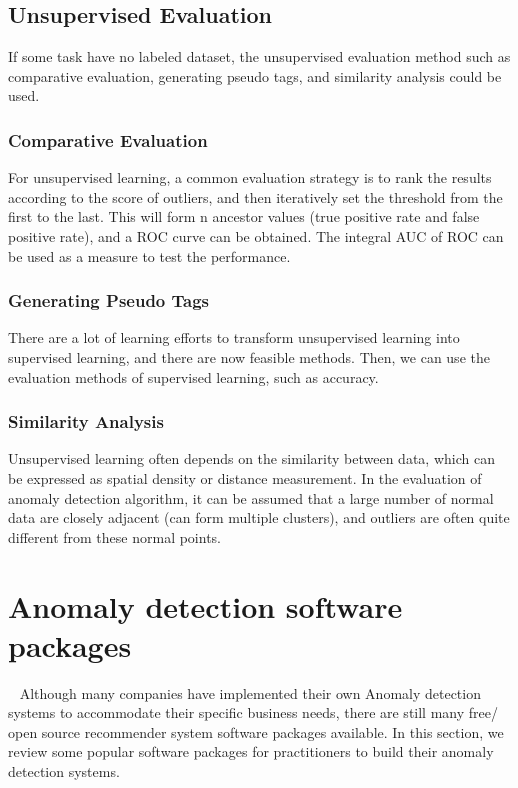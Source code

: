 \subsection{Unsupervised Evaluation}
If some task have no labeled dataset,
the unsupervised evaluation method 
such as comparative evaluation,
generating pseudo tags,
and similarity analysis could be used.

\subsubsection{Comparative Evaluation}

For unsupervised learning, 
a common evaluation strategy is to rank the 
results according to the score of outliers, 
and then iteratively set the threshold from 
the first to the last. 
This will form n ancestor values 
(true positive rate and false positive rate), 
and a ROC curve can be obtained. 
The integral AUC of ROC can be used as a measure 
to test the performance.


\subsubsection{Generating Pseudo Tags}

There are a lot of learning efforts to transform 
unsupervised learning into supervised learning, 
and there are now feasible methods. 
Then, 
we can use the evaluation methods of supervised learning, 
such as accuracy.

\subsubsection{Similarity Analysis}

Unsupervised learning often depends 
on the similarity between data, 
which can be expressed as spatial density 
or distance measurement. 
In the evaluation of anomaly detection algorithm, 
it can be assumed that a large number of normal 
data are closely adjacent (can form multiple clusters), 
and outliers are often quite different from these normal points.

\section{Anomaly detection software packages}~\label{sec:tools}
Although many companies have implemented their own Anomaly detection systems
to accommodate their specific business needs,
there are still many free/ open source recommender system
software packages available.
In this section,
we review some popular software packages for practitioners
to build their anomaly detection systems.

